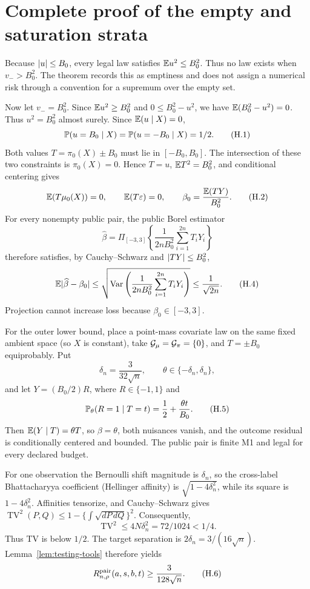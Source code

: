 \section{Complete proof of the empty and saturation strata}
\label{app:boundary}

Because \(\lvert u\rvert\le B_0\), every legal law satisfies
\(\mathbb E u^2\le B_0^2\).  Thus no law exists when \(v_->B_0^2\).
The theorem records this as emptiness and does not assign a numerical risk
through a convention for a supremum over the empty set.

Now let \(v_-=B_0^2\).  Since \(\mathbb E u^2\ge B_0^2\) and
\(0\le B_0^2-u^2\), we have \(\mathbb E(B_0^2-u^2)=0\).
Thus \(u^2=B_0^2\) almost surely.  Since
\(\mathbb E(u\mid X)=0\),
\[
 \mathbb P(u=B_0\mid X)=\mathbb P(u=-B_0\mid X)=1/2.
 \tag{H.1}
\]
Both values \(T=\pi_0(X)\pm B_0\) must lie in \([-B_0,B_0]\).  The
intersection of these two constraints is \(\pi_0(X)=0\).  Hence
\(T=u\), \(\mathbb E T^2=B_0^2\), and conditional centering gives
\[
 \mathbb E(T\mu_0(X))=0,\qquad \mathbb E(T\varepsilon)=0,\qquad
 \beta_0=\frac{\mathbb E(TY)}{B_0^2}.
 \tag{H.2}
\]
For every nonempty public pair, the public Borel estimator
\[
 \widehat\beta=
 \Pi_{[-3,3]}\left\{\frac1{2nB_0^2}
       \sum_{i=1}^{2n}T_iY_i\right\}
 \tag{H.3}
\]
therefore satisfies, by Cauchy--Schwarz and \(\lvert TY\rvert\le B_0^2\),
\[
 \mathbb E\lvert \widehat\beta-\beta_0\rvert
 \le\sqrt{\operatorname{Var}\left(
 \frac1{2nB_0^2}\sum_{i=1}^{2n}T_iY_i\right)}
 \le\frac1{\sqrt{2n}}.
 \tag{H.4}
\]
Projection cannot increase loss because \(\beta_0\in[-3,3]\).

For the outer lower bound, place a point-mass covariate law on the same fixed
ambient space (so \(X\) is constant), take
\(\mathcal G_\mu=\mathcal G_\pi=\{0\}\), and \(T=\pm B_0\) equiprobably.  Put
\[
 \delta_n=\frac{3}{32\sqrt n},\qquad \theta\in\{-\delta_n,\delta_n\},
\]
and let \(Y=(B_0/2)R\), where \(R\in\{-1,1\}\) and
\[
 \mathbb P_\theta(R=1\mid T=t)=\frac12+\frac{\theta t}{B_0}.
 \tag{H.5}
\]
Then \(\mathbb E(Y\mid T)=\theta T\), so \(\beta=\theta\), both nuisances vanish,
and the outcome residual is conditionally centered and bounded.  The public
pair is finite M1 and legal for every declared budget.

For one observation the Bernoulli shift magnitude is \(\delta_n\), so the
cross-label Bhattacharyya coefficient (Hellinger affinity) is
\(\sqrt{1-4\delta_n^2}\), while its square is \(1-4\delta_n^2\).
Affinities tensorize, and Cauchy--Schwarz gives
\(\operatorname{TV}^2(P,Q)\le1-\{\int\sqrt{dP\,dQ}\}^2\).  Consequently,
\[
 \operatorname{TV}^2\le4N\delta_n^2=72/1024<1/4.
\]
Thus TV is below \(1/2\).  The target separation is
\(2\delta_n=3/(16\sqrt n)\).  Lemma~\ref{lem:testing-tools} therefore yields
\[
 R^{\mathrm{pair}}_{n,\rho}(a,s,b,t)\ge\frac{3}{128\sqrt n}.
 \tag{H.6}
\]
